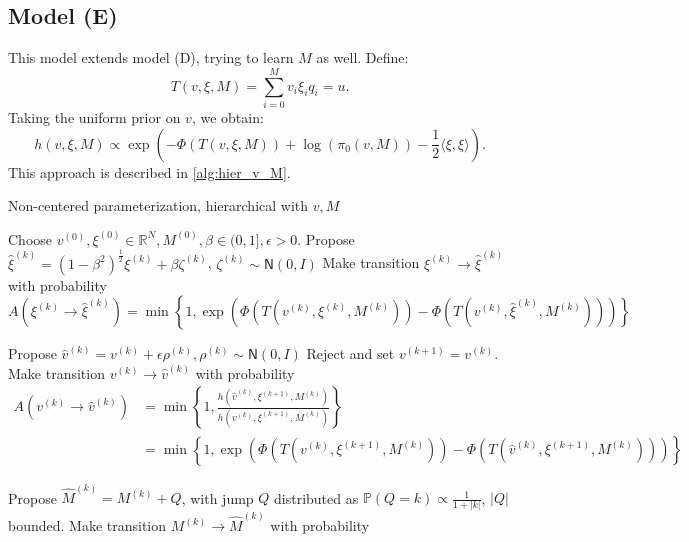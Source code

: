 \documentclass{siamart1116}
\begin{document}
    \subsection{Model (E)}
        This model extends model (D), trying to learn $M$ as well. Define:
        \begin{equation}
        T(v,\xi,M) = \sum_{i=0}^{M} v_i\xi_iq_i = u.
        \end{equation}
        Taking the uniform prior on $v$, we obtain:
        \begin{equation}
        \label{eqn:learn_v_M_posterior}
        h(v, \xi, M) \propto \exp \left(-\Phi(T(v,\xi, M)) + \log (\pi_0(v, M)) - \frac{1}{2}\langle \xi, \xi \rangle  \right).
        \end{equation}
        This approach is described in \cref{alg:hier_v_M}.
        \begin{algorithm}
        \caption{Non-centered parameterization, hierarchical with $v, M$}
        \label{alg:hier_v_M}
        \begin{algorithmic}[1]
        \State Choose $v^{(0)}, \xi^{(0)} \in \mathbb{R}^N, M^{(0)}, \beta \in (0, 1], \epsilon > 0$.
        \State Propose $\hat\xi^{(k)} = (1-\beta^2)^{\frac{1}{2}}\xi^{(k)} + \beta \zeta^{(k)}$, $\zeta^{(k)} \sim \mathsf{N}(0, I)$
        \State Make transition $\xi^{(k)} \to \hat\xi^{(k)}$ with probability
        \[ A(\xi^{(k)} \to \hat\xi^{(k)}) = \min\left\{1, \exp\left(\Phi(T(v^{(k)}, \xi^{(k)}, M^{(k)})) - \Phi(T(v^{(k)}, \hat \xi^{(k)}, M^{(k)}))\right) \right\}\]

        \State Propose $\hat v^{(k)} = v^{(k)} + \epsilon \rho^{(k)}, \rho^{(k)} \sim \mathsf{N}(0,I)$
            \State Reject and set $v^{(k+1)} = v^{(k)}$.
        \Else
        \State Make transition $v^{(k)} \to \hat v^{(k)}$ with probability
        \begin{align*}
         A(v^{(k)} \to \hat v^{(k)}) &= \min\left\{1, \frac{h(\hat v^{(k)}, \xi^{(k+1)}, M^{(k)})}{h(v^{(k)}, \xi^{(k+1)}, M^{(k)})}\right\} \\
         &= \min\left\{1, \exp\left(\Phi(T(v^{(k)}, \xi^{(k+1)},M^{(k)}))-\Phi(T(\hat v^{(k)}, \xi^{(k+1)}, M^{(k)})) \right) \right\}
         \end{align*}
        \EndIf

        \State Propose $\hat M^{(k)} = M^{(k)} + Q$, with jump $Q$ distributed as $\mathbb{P}(Q=k) \propto \frac{1}{1+|k|}$, $|Q|$ bounded.
        \State Make transition $M^{(k)} \to \hat M^{(k)}$ with probability


\end{algorithmic}
\end{algorithm}
\end{document}
